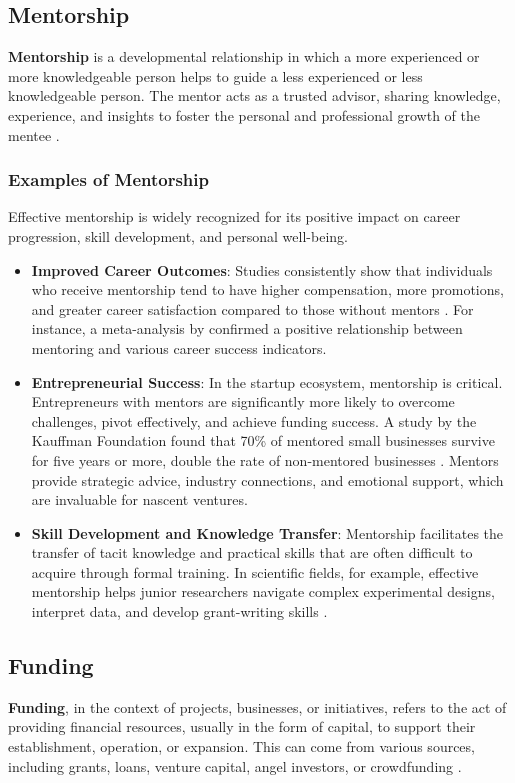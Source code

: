 \documentclass[../Main.tex]{subfiles}
\begin{document}
\subsection{Mentorship}
\textbf{Mentorship} is a developmental relationship in which a more experienced or more knowledgeable person helps to guide a less experienced or less knowledgeable person. The mentor acts as a trusted advisor, sharing knowledge, experience, and insights to foster the personal and professional growth of the mentee \cite{jacobi1991mentorship, nationalacademies2019mentoring}.

\subsubsection*{Examples of Mentorship}
Effective mentorship is widely recognized for its positive impact on career progression, skill development, and personal well-being.
\begin{itemize}
\item \textbf{Improved Career Outcomes}: Studies consistently show that individuals who receive mentorship tend to have higher compensation, more promotions, and greater career satisfaction compared to those without mentors \cite{ragins1999review}. For instance, a meta-analysis by \cite{underhill2006mentoring} confirmed a positive relationship between mentoring and various career success indicators.
\item \textbf{Entrepreneurial Success}: In the startup ecosystem, mentorship is critical. Entrepreneurs with mentors are significantly more likely to overcome challenges, pivot effectively, and achieve funding success. A study by the Kauffman Foundation found that 70\% of mentored small businesses survive for five years or more, double the rate of non-mentored businesses \cite{kauffman2013mentoring}. Mentors provide strategic advice, industry connections, and emotional support, which are invaluable for nascent ventures.
\item \textbf{Skill Development and Knowledge Transfer}: Mentorship facilitates the transfer of tacit knowledge and practical skills that are often difficult to acquire through formal training. In scientific fields, for example, effective mentorship helps junior researchers navigate complex experimental designs, interpret data, and develop grant-writing skills \cite{nationalacademies2019mentoring}.
\end{itemize}

\subsection{Funding}
\textbf{Funding}, in the context of projects, businesses, or initiatives, refers to the act of providing financial resources, usually in the form of capital, to support their establishment, operation, or expansion. This can come from various sources, including grants, loans, venture capital, angel investors, or crowdfunding \cite{bruneel2010funding, lerner2018venture}.
\end{document}
